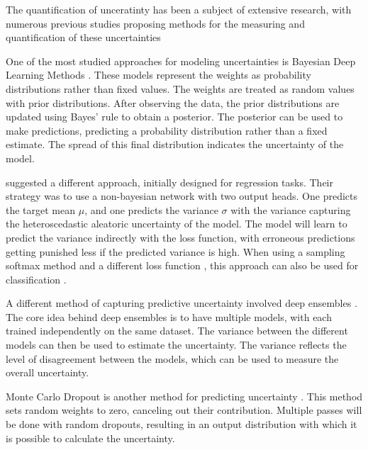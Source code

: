 The quantification of unceratinty has been a subject of extensive research, with numerous previous studies proposing methods for the measuring and quantification of these uncertainties

One of the most studied approaches for modeling uncertainties is Bayesian Deep Learning Methods \citep{kendall2017uncertainties, chen2020uncertainty}. These models represent the weights as probability distributions rather than fixed values. The weights are treated as random values with prior distributions. After observing the data, the prior distributions are updated using Bayes' rule to obtain a posterior. The posterior can be used to make predictions, predicting a probability distribution rather than a fixed estimate. The spread of this final distribution indicates the uncertainty of the model.

\cite{nix1994estimating} suggested a different approach, initially designed for regression tasks. Their strategy was to use a non-bayesian network with two output heads. One predicts the target mean $\mu$, and one predicts the variance $\sigma$ with the variance capturing the heteroscedastic aleatoric uncertainty of the model. The model will learn to predict the variance indirectly with the loss function, with erroneous predictions getting punished less if the predicted variance is high. When using a sampling softmax method and a different loss function , this approach can also be used for classification \citep{kendall2017uncertainties}.

A different method of capturing predictive uncertainty involved deep ensembles \citep{lakshminarayanan2017simple}. The core idea behind deep ensembles is to have multiple models, with each trained independently on the same dataset. The variance between the different models can then be used to estimate the uncertainty. The variance reflects the level of disagreement between the models, which can be used to measure the overall uncertainty.

Monte Carlo Dropout is another method for predicting uncertainty \citep{gal2016dropout}. This method sets random weights to zero, canceling out their contribution. Multiple passes will be done with random dropouts, resulting in an output distribution with which it is possible to calculate the uncertainty.

